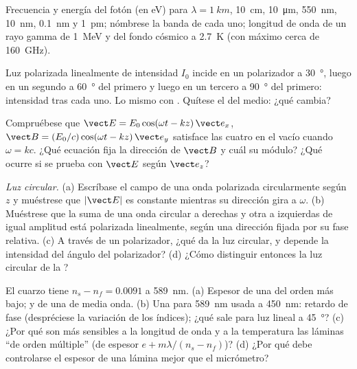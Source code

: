 \begin{exercise}[$\star$]\label{exo:b2:plane-waves-polarization:2}
Frecuencia y energía del fotón (en eV) para $\lambda = \qty{1}{km}$, \qty{10}{cm},
\qty{10}{\micro m}, \qty{550}{nm}, \qty{10}{nm}, \qty{0.1}{nm} y \qty{1}{pm}; nómbrese la
banda de cada uno; longitud de onda de un rayo gamma de \qty{1}{MeV} y del
fondo cósmico a \qty{2.7}{K} (con máximo cerca de \qty{160}{GHz}).
\end{exercise}

\begin{exercise}[$\star$]\label{exo:b2:plane-waves-polarization:3}
Luz polarizada linealmente de intensidad $I_0$ incide en un polarizador a
\qty{30}{\degree}, luego en un segundo a \qty{60}{\degree} del primero y luego
en un tercero a \qty{90}{\degree} del primero: intensidad tras cada uno. Lo
mismo con . Quítese el del medio: ¿qué cambia?
\end{exercise}

\begin{exercise}[$\star$]\label{exo:b2:plane-waves-polarization:4}
Compruébese que $\vect E = E_0\cos(\omega t - kz)\,\vect e_x$, $\vect B = (E_0/c)\cos(\omega t
- kz)\,\vect e_y$ satisface las cuatro  en el vacío cuando $\omega =
kc$. ¿Qué ecuación fija la dirección de $\vect B$ y cuál su módulo? ¿Qué
ocurre si se prueba con $\vect E$ según $\vect e_z$?
\end{exercise}

\begin{exercise}[$\star\star$]\label{exo:b2:plane-waves-polarization:5}
\emph{Luz circular.} (a) Escríbase el campo de una onda polarizada
circularmente según $z$ y muéstrese que $|\vect E|$ es constante mientras su
dirección gira a $\omega$. (b) Muéstrese que la suma de una onda circular a
derechas y otra a izquierdas de igual amplitud está polarizada
linealmente, según una dirección fijada por su fase relativa. (c) A través
de un polarizador, ¿qué da la luz circular, y depende la intensidad del
ángulo del polarizador? (d) ¿Cómo distinguir entonces la luz circular de la ?
\end{exercise}

\begin{exercise}[$\star\star$]\label{exo:b2:plane-waves-polarization:6}
El cuarzo tiene $n_s - n_f = 0.0091$ a \qty{589}{nm}. (a) Espesor de una
 del orden más bajo; y de una de media onda. (b) Una
 para \qty{589}{nm} usada a \qty{450}{nm}: retardo de fase
(despréciese la variación de los índices); ¿qué sale para luz lineal
a \qty{45}{\degree}? (c) ¿Por qué son más sensibles a la longitud de onda y
a la temperatura las láminas ``de orden múltiple'' (de espesor $e +
m\lambda/(n_s - n_f)$)? (d) ¿Por qué debe controlarse el espesor de una lámina
mejor que el micrómetro?
\end{exercise}

